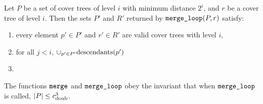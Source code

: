 \documentclass[../main.tex]{subfiles}
\newcommand{\doubnum}{c_\textnormal{doub}}
\newcommand{\mkfunction}[1]{\ifmmode{\text{{#1}}}}
\newcommand{\descendants}[1]{\mkfunction{descendants}({#1})}
\newcommand{\mkprocedure}[1]{\ifmmode \textnormal{\ttfamily {#1}}}
\newcommand{\ctmergeloop}{\mkprocedure{merge\_loop}}
\newcommand{\ctmerge}{\ensuremath{\textnormal{\ttfamily merge}}}
\begin{document}
\begin{lemma}
    Let $P$ be a set of cover trees of level $i$ with minimum distance $2^i$, 
    and $r$ be a cover tree of level $i$.
    Then the sets $P'$ and $R'$ returned by $\ctmergeloop(P,r)$ satisfy:
    \begin{enumerate}
        \item every element $p' \in P'$ and $r'\in R'$ are valid cover trees with level $i$,
        \item for all $j<i$, $\cup_{p' \in P'} \descendants {p'}$
        \item 
    \end{enumerate}
\end{lemma}

\begin{lemma}
    The functions $\ctmerge$ and $\ctmergeloop$ obey the invariant that when $\ctmergeloop$ is called, $|P| \le \doubnum^3$.
\end{lemma}

\end{document}
